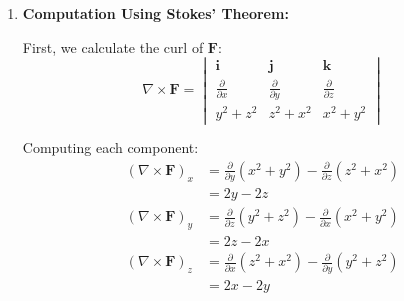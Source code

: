 \begin{example}
\begin{solution}
\begin{enumerate}
    Now, let's evaluate $\mathbf{F}$ along the curve. On $C$, we have $x^2 + y^2 = 1$ and $z = 1 - \cos t - \sin t$, so:
    \[
    \begin{aligned}
    \mathbf{F}(\mathbf{r}(t)) &= (\sin^2 t + (1-\cos t-\sin t)^2)\,\mathbf{i} \\
    &+ ((1-\cos t-\sin t)^2 + \cos^2 t)\,\mathbf{j} \\
    &+ (x^2 + y^2)\,\mathbf{k} \\
    &= (\sin^2 t + (1-\cos t-\sin t)^2)\,\mathbf{i} \\
    &+ ((1-\cos t-\sin t)^2 + \cos^2 t)\,\mathbf{j} \\
    &+ (1)\,\mathbf{k}
    \end{aligned}
    \]
    
    The dot product is:
    \[
    \begin{aligned}
    \mathbf{F} \cdot \frac{d\mathbf{r}}{dt} &= -(\sin^2 t + (1-\cos t-\sin t)^2)\sin t \\
    &+ ((1-\cos t-\sin t)^2 + \cos^2 t)\cos t \\
    &+ (1)(\sin t - \cos t)
    \end{aligned}
    \]
    
    When integrated over $[0, 2\pi]$, terms with $\sin t$, $\cos t$, $\sin^3 t$, $\cos^3 t$, and other odd powers or mixed products all evaluate to zero due to their periodic nature. Therefore:
    \[
    \oint_C \mathbf{F} \cdot d\mathbf{r} = 0
    \]
    
    Let's verify this using Stokes' Theorem.
    
    \item \textbf{Computation Using Stokes' Theorem:}
    
    First, we calculate the curl of $\mathbf{F}$:
    \[
    \nabla \times \mathbf{F} = \begin{vmatrix}
    \mathbf{i} & \mathbf{j} & \mathbf{k} \\
    \frac{\partial}{\partial x} & \frac{\partial}{\partial y} & \frac{\partial}{\partial z} \\
    y^2 + z^2 & z^2 + x^2 & x^2 + y^2
    \end{vmatrix}
    \]
    
    Computing each component:
    \[
    \begin{aligned}
    (\nabla \times \mathbf{F})_x &= \frac{\partial}{\partial y}(x^2 + y^2) - \frac{\partial}{\partial z}(z^2 + x^2) \\
    &= 2y - 2z \\
    (\nabla \times \mathbf{F})_y &= \frac{\partial}{\partial z}(y^2 + z^2) - \frac{\partial}{\partial x}(x^2 + y^2) \\
    &= 2z - 2x \\
    (\nabla \times \mathbf{F})_z &= \frac{\partial}{\partial x}(z^2 + x^2) - \frac{\partial}{\partial y}(y^2 + z^2) \\
    &= 2x - 2y
    \end{aligned}
    \]
    

\end{enumerate}
\end{solution}
\end{example}
